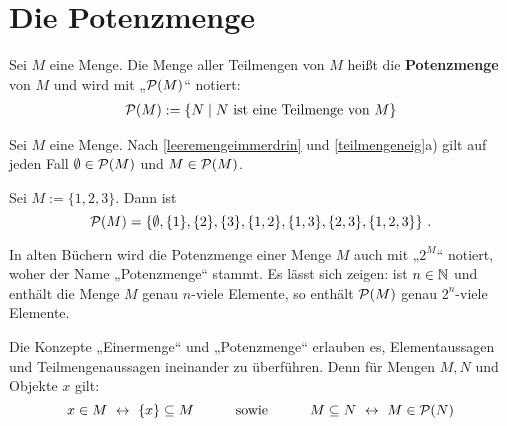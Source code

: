 \section{Die Potenzmenge}


\begin{de}[Potenzmenge] \label{def:potenzmenge} 
    Sei $M$ eine Menge. Die Menge aller Teilmengen von $M$ heißt die \textbf{Potenzmenge} von $M$ und wird mit „$\mathcal P(M)$“ notiert:
    \begin{align*}
        \mathcal P(M) := \{N \mid N \ \text{ist eine Teilmenge von $M$} \}
    \end{align*}
\end{de}


\begin{bem}
    Sei $M$ eine Menge. Nach \cref{leeremengeimmerdrin} und \cref{teilmengeneig}a) gilt auf jeden Fall $\emptyset\in \mathcal P(M)$ und $M\in \mathcal P(M)$.
\end{bem}


\begin{bsp} \label{bsp:potenzmenge}
    Sei $M:=\{1,2,3\}$. Dann ist
        \[ \mathcal P(M)=\left\{\emptyset,\{1\},\{2\},\{3\},\{1,2\},\{1,3\},\{2,3\},\{1,2,3\}\right\}\,. \]
\end{bsp}


\noindent In alten Büchern wird die Potenzmenge einer Menge $M$ auch mit „$2^M$“ notiert, woher der Name „Potenzmenge“ stammt. Es lässt sich zeigen: ist $n\in \mathbb N$ und enthält die Menge $M$ genau $n$-viele Elemente, so enthält $\mathcal P(M)$ genau $2^n$-viele Elemente.


\begin{bem}
    Die Konzepte „Einermenge“ und „Potenzmenge“ erlauben es, Elementaussagen und Teilmengenaussagen ineinander zu überführen. Denn für Mengen $M,N$ und Objekte $x$ gilt:
        \[ x\in M\ \leftrightarrow\ \{x\}\subseteq M \quad\qquad\text{sowie}\quad\qquad M\subseteq N\  \leftrightarrow\ M\in \calP(N) \]
\end{bem}


